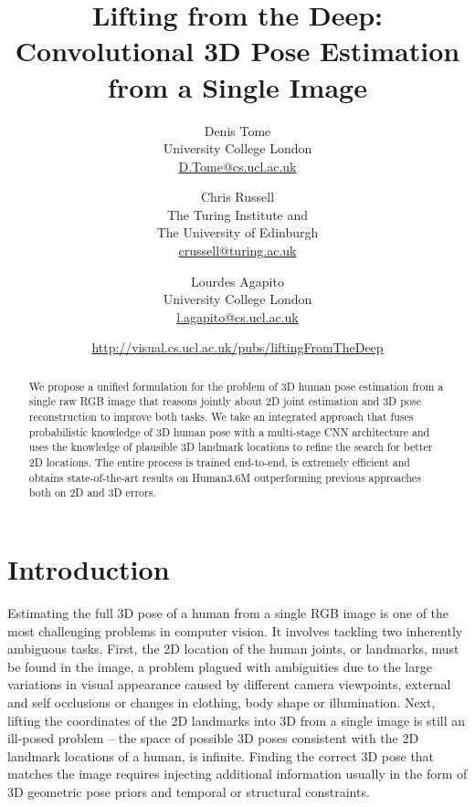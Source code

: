 \documentclass[10pt,twocolumn,letterpaper]{article}
\begin{document}
\graphicspath{{Images/}}
\newcommand{\comment}[2]{#2}
\title{Lifting from the Deep: Convolutional 3D Pose
Estimation from a Single Image} 


\author{Denis Tome               \\
University College London                       \\
\href{mailto:D.Tome@cs.ucl.ac.uk}{D.Tome@cs.ucl.ac.uk}
\and
Chris Russell                      \\
 The Turing Institute and\\
The University of Edinburgh\\
\href{mailto:crussell@turing.ac.uk}{crussell@turing.ac.uk}
\and
Lourdes Agapito\\
University College London                       \\
\href{mailto:l.agapito@cs.ucl.ac.uk}{l.agapito@cs.ucl.ac.uk}
\and
\url{http://visual.cs.ucl.ac.uk/pubs/liftingFromTheDeep}}

\maketitle
\thispagestyle{empty}

\begin{abstract}
  We propose a unified formulation for the problem of 3D human pose
  estimation from a single raw RGB image that reasons jointly about 2D
  joint estimation and 3D pose reconstruction to improve both tasks.
  We take an integrated approach that fuses probabilistic knowledge of
  3D human pose with a multi-stage CNN architecture and uses the
  knowledge of plausible 3D landmark locations to refine the search
  for better 2D locations. The entire process is trained end-to-end,
  is extremely efficient and obtains state-of-the-art results on
  Human3.6M outperforming previous approaches both on 2D and 3D
  errors.
  \vspace{-5mm}
\end{abstract}

\section{Introduction}
Estimating the full 3D pose of a human from a single RGB image is one
of the most challenging problems in computer vision. It involves
tackling two inherently ambiguous tasks. First, the 2D location of the
human joints, or landmarks, must be found in the image, a problem
plagued with ambiguities due to the large variations in visual
appearance caused by different camera viewpoints, external and self
occlusions or changes in clothing, body shape or illumination. Next,
lifting the coordinates of the 2D landmarks into 3D from a single
image is still an ill-posed problem -- the space of possible 3D poses
consistent with the 2D landmark locations of a
human, is infinite. Finding the correct 3D pose that matches the image requires injecting additional
information usually in the form of 3D geometric pose priors and
temporal or structural constraints.
\end{document}
